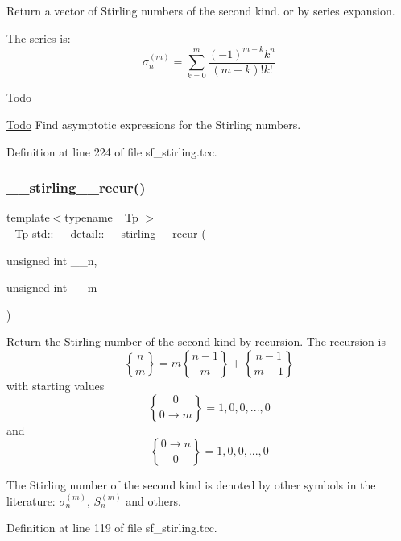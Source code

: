 Return a vector of Stirling numbers of the second kind. or by series expansion.

The series is\+: \[ \sigma_n^{(m)} = \sum_{k=0}^{m}\frac{(-1)^{m-k}k^n}{(m-k)!k!} \]

\begin{DoxyRefDesc}{Todo}
\item[\hyperlink{todo__todo000013}{Todo}]Find asymptotic expressions for the Stirling numbers. \end{DoxyRefDesc}


Definition at line 224 of file sf\+\_\+stirling.\+tcc.

\mbox{\label{namespacestd_1_1____detail_a23c6eb236cd8ddcfbe43e66ac23324db}} 
\subsubsection{\texorpdfstring{\+\_\+\+\_\+stirling\+\_\+\_\+recur()}{\_\_stirling\_2\_recur()}\hspace{0.1cm}{\footnotesize\ttfamily [1/2]}}
{\footnotesize\ttfamily template$<$typename \+\_\+\+Tp $>$ \\
\+\_\+\+Tp std\+::\+\_\+\+\_\+detail\+::\+\_\+\+\_\+stirling\+\_\+\_\+recur (\begin{DoxyParamCaption}\item[{unsigned int}]{\+\_\+\+\_\+n,  }\item[{unsigned int}]{\+\_\+\+\_\+m }\end{DoxyParamCaption})}

Return the Stirling number of the second kind by recursion. The recursion is \[ \genfrac{\{}{\}}{0pt}{0}{n}{m} = m \genfrac{\{}{\}}{0pt}{0}{n-1}{m} + \genfrac{\{}{\}}{0pt}{0}{n-1}{m-1} \] with starting values \[ \genfrac{\{}{\}}{0pt}{0}{0}{0\rightarrow m} = {1, 0, 0, ..., 0} \] and \[ \genfrac{\{}{\}}{0pt}{0}{0\rightarrow n}{0} = {1, 0, 0, ..., 0} \]

The Stirling number of the second kind is denoted by other symbols in the literature\+: $ \sigma_n^{(m)} $, $ \textit{S}_n^{(m)} $ and others. 

Definition at line 119 of file sf\+\_\+stirling.\+tcc.

